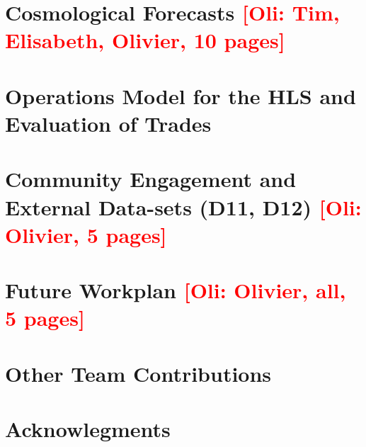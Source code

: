 \documentclass[letter]{ar-1col_WFIRST-HLS}
\newcommand{\Oli}[1]{\textcolor{red}{[{\bf Oli}: #1]}}
\begin{document}
\section{Cosmological Forecasts \Oli{Tim, Elisabeth, Olivier, 10 pages}}
\label{sec:forecast}


\section{Operations Model for the HLS and Evaluation of Trades}
\label{sec:operation}


\section{Community Engagement and External Data-sets (D11, D12) \Oli{Olivier, 5 pages}}
\label{sec:engagement}


\section{Future Workplan \Oli{Olivier, all, 5 pages}}
\label{sec:workplan}


\section{Other Team Contributions}
\label{sec:other_contributions}


\section*{Acknowlegments}
\label{sec:acknowledgments}


\newpage
\end{document}
